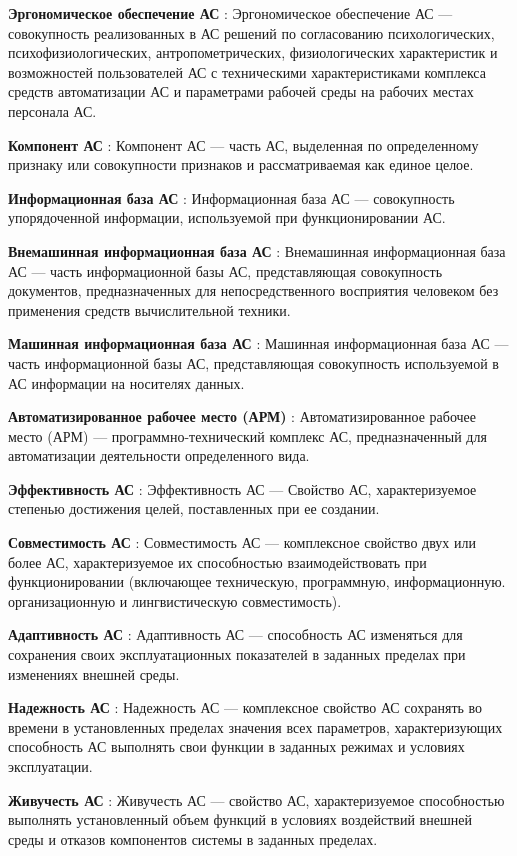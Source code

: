 \textbf{ Эргономическое обеспечение АС} : Эргономическое обеспечение АС — совокупность реализованных в АС решений по согласованию психологических, психофизиологических, антропометрических, физиологических характеристик и возможностей пользователей АС с техническими характеристиками комплекса средств автоматизации АС и параметрами рабочей среды на рабочих местах персонала АС.

\textbf{ Компонент АС} : Компонент АС — часть АС, выделенная по определенному признаку или совокупности признаков и рассматриваемая как единое целое.

\textbf{ Информационная база АС} : Информационная база АС — совокупность упорядоченной информации, используемой при функционировании АС.

\textbf{ Внемашинная информационная база АС} : Внемашинная информационная база АС — часть информационной базы АС, представляющая совокупность документов, предназначенных для непосредственного восприятия человеком без применения средств вычислительной техники.

\textbf{ Машинная информационная база АС} :  Машинная информационная база АС — часть информационной базы АС, представляющая совокупность используемой в АС информации на носителях данных.

\textbf{ Автоматизированное рабочее место (АРМ)} : Автоматизированное рабочее место (АРМ) — программно-технический комплекс АС, предназначенный для автоматизации деятельности определенного вида.

\textbf{ Эффективность АС} : Эффективность АС — Свойство АС, характеризуемое степенью достижения целей, поставленных при ее создании.

\textbf{ Совместимость АС} : Совместимость АС — комплексное свойство двух или более АС, характеризуемое их способностью взаимодействовать при функционировании (включающее техническую, программную, информационную. организационную и лингвистическую совместимость).

\textbf{ Адаптивность АС} : Адаптивность АС — способность АС изменяться для сохранения своих эксплуатационных показателей в заданных пределах при изменениях внешней среды.

\textbf{ Надежность АС} : Надежность АС — комплексное свойство АС сохранять во времени в установленных пределах значения всех параметров, характеризующих способность АС выполнять свои функции в заданных режимах и условиях эксплуатации.

\textbf{ Живучесть АС} : Живучесть АС — свойство АС, характеризуемое способностью выполнять установленный объем функций в условиях воздействий внешней среды и отказов компонентов системы в заданных пределах.

